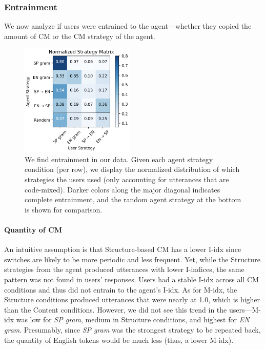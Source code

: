 \documentclass[11pt,a4paper]{article}
\begin{document}
\subsubsection{Entrainment}
We now analyze if users were entrained to the agent---whether they copied the amount of CM or the CM strategy of the agent.
\begin{figure}[!h]
	\centering
	\includegraphics[width=0.48\textwidth]{img/1031_entrain}
  	\caption{We find entrainment in our data. Given each agent strategy condition (per row), we display the normalized distribution of which strategies the users used (only accounting for utterances that are code-mixed). Darker colors along the major diagonal indicates complete entrainment, and the random agent strategy at the bottom is shown for comparison.}
    \label{fig:entrain_matrix}
\end{figure}

\paragraph{Quantity of CM}
An intuitive assumption is that Structure-based CM has a lower I-idx since switches are likely to be more periodic and less frequent.
Yet, while the Structure strategies from the agent produced utterances with lower I-indices, the same pattern was not found in users' responses. 
Users had a stable I-idx across all CM conditions and thus did not entrain to the agent's I-idx. 
As for M-idx, the Structure conditions produced utterances that were nearly at 1.0, which is higher than the Content conditions. 
However, we did not see this trend in the users---M-idx was low for \textit{SP gram}, medium in Structure conditions, and highest for \textit{EN gram}.
Presumably, since \textit{SP gram} was the strongest strategy to be repeated back, the quantity of English tokens would be much less (thus, a lower M-idx). 
\end{document}
